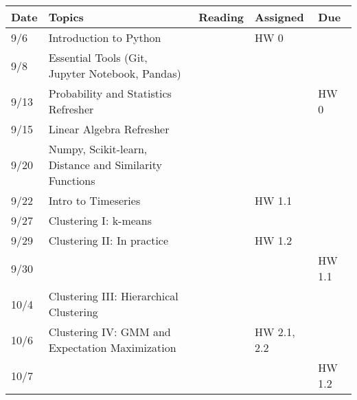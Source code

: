 \documentclass[11pt]{article}
\begin{document}
\small
\begin{centering}
\begin{tabular}{||l|p{3in}|l|l|l||}
\hline\hline
Date & Topics  & Reading & Assigned & Due  \\
\hline\hline
9/6 & Introduction to Python &  &  HW 0 & \\
9/8 & Essential Tools (Git, Jupyter Notebook, Pandas) & & & \\

\hline
9/13 & Probability and Statistics Refresher & &  & HW 0 \\
9/15 & Linear Algebra Refresher & & & \\
\hline
 9/20 & Numpy, Scikit-learn, Distance and Similarity Functions & &  & \\
9/22 & Intro to Timeseries & & HW 1.1& \\ 
\hline

9/27 & Clustering I: k-means & & & \\
9/29 & Clustering II: In practice & &HW 1.2  & \\ 
9/30 &&&& HW 1.1 \\
\hline

10/4 & Clustering III: Hierarchical Clustering & & & \\  
10/6 & Clustering IV: GMM and Expectation Maximization& & HW 2.1, 2.2 & \\ 
10/7 &&&& HW 1.2 \\
\hline


\end{tabular}
\end{centering}
\end{document}
